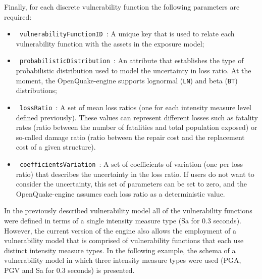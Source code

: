Finally, for each discrete \gls{vulnerability function} the following parameters are required:
\begin{itemize}
\item  \Verb+ vulnerabilityFunctionID +: A unique key that is used to relate each \gls{vulnerability function} with the \glspl{asset} in the \gls{exposure model};
\item  \Verb+ probabilisticDistribution +: An attribute that establishes the type of probabilistic distribution used to model the uncertainty in loss ratio. At the moment, the OpenQuake-engine supports lognormal (\Verb+LN+) and beta (\Verb+BT+) distributions;
\item  \Verb+ lossRatio +: A set of mean loss ratios (one for each intensity measure level defined previously). These values can represent different losses such as fatality rates (ratio between the number of fatalities and total population exposed) or so-called damage ratio (ratio between the repair cost and the replacement cost of a given structure).
\item  \Verb+ coefficientsVariation +: A set of coefficients of variation (one per loss ratio) that describes the uncertainty in the loss ratio. If users do not want to consider the uncertainty, this set of parameters can be set to zero, and the OpenQuake-engine assumes each loss ratio as a deterministic value.
\end{itemize}

In the previously described \gls{vulnerability model} all of the \glspl{vulnerability function} were defined in terms of a single intensity measure type (Sa for 0.3 seconds). However, the current version of the engine also allows the employment of a \gls{vulnerability model} that is comprised of \glspl{vulnerability function} that each use distinct intensity measure types. In the following example, the schema of a \gls{vulnerability model} in which three intensity measure types were used (PGA, PGV and Sa for 0.3 seconds) is presented.

